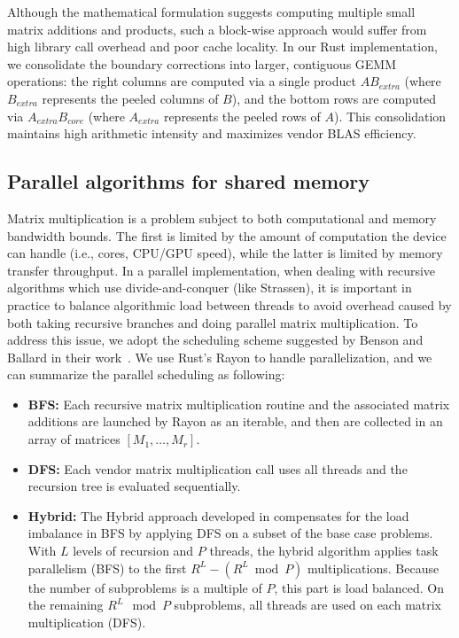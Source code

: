 \documentclass[a4paper, leqno, 11pt]{article}
\theoremstyle{definition}
\theoremstyle{remark}
\theoremstyle{experimental}
\begin{document}
Although the mathematical formulation suggests computing multiple small matrix additions and products, such a block-wise approach would suffer from high library call overhead and poor cache locality. In our Rust implementation, we consolidate the boundary corrections into larger, contiguous GEMM operations: the right columns are computed via a single product $A B_{extra}$ (where $B_{extra}$ represents the peeled columns of $B$), and the bottom rows are computed via $A_{extra} B_{core}$ (where $A_{extra}$ represents the peeled rows of $A$). This consolidation maintains high arithmetic intensity and maximizes vendor BLAS efficiency.


\subsection{Parallel algorithms for shared memory}
\label{sec:par_alg_shared}

Matrix multiplication is a problem subject to both computational and memory bandwidth bounds. The first is
limited by the amount of computation the device can handle (i.e., cores, CPU/GPU speed), while the
latter is limited by memory transfer throughput. In a parallel implementation,
when dealing with recursive algorithms which use divide-and-conquer (like Strassen), it is important
in practice to balance algorithmic load between threads to avoid overhead caused by both taking
recursive branches and doing parallel matrix multiplication. To address this issue, we adopt the
scheduling scheme suggested by Benson and Ballard in their work~\cite{bensonballard2015}.
We use Rust's Rayon to handle parallelization, and we can summarize the parallel scheduling as
following: 

\begin{itemize}
  \item \textbf{BFS:} Each recursive matrix multiplication routine and the associated matrix
    additions are launched by Rayon as an iterable, and then are collected in an array of matrices $
    \left[M_1, \ldots, M_r \right]$.
  \item \textbf{DFS:} Each vendor matrix multiplication call uses all threads and the recursion tree is evaluated sequentially.
  \item \textbf{Hybrid:} The Hybrid approach developed in \cite{bensonballard2015} compensates 
    for the load imbalance in BFS by applying DFS on a subset of the base case problems. With $ L $
    levels of recursion and $ P $ threads, the hybrid algorithm applies task parallelism (BFS) to
    the first $ R^L - (R^L \bmod P) $ multiplications. Because the number of subproblems is a multiple
    of $ P $, this part is load balanced. On the remaining $ R^L \mod P $ subproblems, all threads
    are used on each matrix multiplication (DFS).
\end{itemize}
\end{document}
